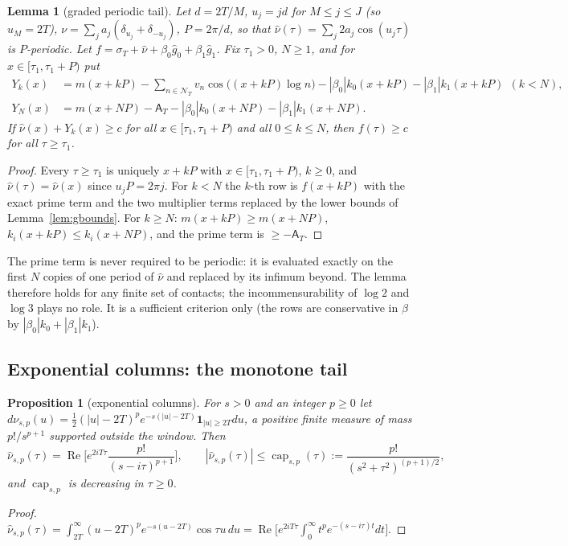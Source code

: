 \documentclass[11pt]{amsart}
\newtheorem{proposition}[theorem]{Proposition}
\newtheorem{lemma}[theorem]{Lemma}
\theoremstyle{definition}
\theoremstyle{remark}
\newcommand{\Rel}{\operatorname{Re}}
\newcommand{\sT}{\sigma_T}
\newcommand{\gh}[1]{\widehat g_{#1}}
\newcommand{\nuh}{\widehat\nu}
\newcommand{\NT}{\mathcal N_T}
\newcommand{\Aconst}{\mathsf A_T}
\begin{document}
\begin{lemma}[graded periodic tail]\label{lem:F1}
Let $d=2T/M$, $u_j=jd$ for $M\le j\le J$ (so $u_M=2T$), $\nu=\sum_ja_j(\delta_{u_j}+\delta_{-u_j})$,
$P=2\pi/d$, so that $\nuh(\tau)=\sum_j2a_j\cos(u_j\tau)$ is $P$-periodic. Let
$f=\sT+\nuh+\beta_0\gh0+\beta_1\gh1$. Fix $\tau_1>0$, $N\ge1$, and for $x\in[\tau_1,\tau_1+P)$ put
\begin{align*}
Y_k(x)&=m(x+kP)-\sum_{n\in\NT}v_n\cos\big((x+kP)\log n\big)-|\beta_0|k_0(x+kP)-|\beta_1|k_1(x+kP)\ \ (k<N),\\
Y_N(x)&=m(x+NP)-\Aconst-|\beta_0|k_0(x+NP)-|\beta_1|k_1(x+NP).
\end{align*}
If $\nuh(x)+Y_k(x)\ge c$ for all $x\in[\tau_1,\tau_1+P)$ and all $0\le k\le N$, then $f(\tau)\ge c$
for all $\tau\ge\tau_1$.
\end{lemma}
\begin{proof}
Every $\tau\ge\tau_1$ is uniquely $x+kP$ with $x\in[\tau_1,\tau_1+P)$, $k\ge0$, and
$\nuh(\tau)=\nuh(x)$ since $u_jP=2\pi j$. For $k<N$ the $k$-th row is $f(x+kP)$ with the exact
prime term and the two multiplier terms replaced by the lower bounds of Lemma~\ref{lem:gbounds}.
For $k\ge N$: $m(x+kP)\ge m(x+NP)$, $k_i(x+kP)\le k_i(x+NP)$, and the prime term is $\ge-\Aconst$.
\end{proof}

The prime term is never required to be periodic: it is evaluated exactly on the first $N$
copies of one period of $\nuh$ and replaced by its infimum beyond. The lemma therefore holds
for any finite set of contacts; the incommensurability of $\log2$ and $\log3$ plays no role.
It is a sufficient criterion only (the rows are conservative in $\beta$ by
$|\beta_0|k_0+|\beta_1|k_1$).

\subsection{Exponential columns: the monotone tail}

\begin{proposition}[exponential columns]\label{prop:T0}
For $s>0$ and an integer $p\ge0$ let $d\nu_{s,p}(u)=\frac12(|u|-2T)^pe^{-s(|u|-2T)}\mathbf 1_{|u|\ge2T}du$,
a positive finite measure of mass $p!/s^{p+1}$ supported outside the window. Then
\[
\nuh_{s,p}(\tau)=\Rel\Big[e^{2iT\tau}\frac{p!}{(s-i\tau)^{p+1}}\Big],\qquad
|\nuh_{s,p}(\tau)|\le\operatorname{cap}_{s,p}(\tau):=\frac{p!}{(s^2+\tau^2)^{(p+1)/2}},
\]
and $\operatorname{cap}_{s,p}$ is decreasing in $\tau\ge0$.
\end{proposition}
\begin{proof}
$\nuh_{s,p}(\tau)=\int_{2T}^\infty(u-2T)^pe^{-s(u-2T)}\cos\tau u\,du=\Rel\big[e^{2iT\tau}\int_0^\infty t^pe^{-(s-i\tau)t}dt\big]$.
\end{proof}
\end{document}
